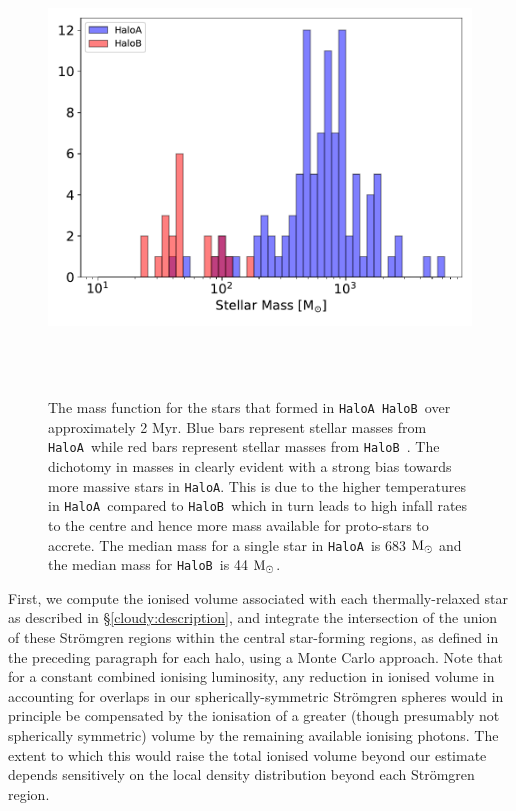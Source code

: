 \documentclass[graphics, twocolumn, usenatbib]{mn2e}
\newcommand{\msolar} {$\rm{M_{\odot}}~$}
\newcommand{\msolarc} {$\rm{M_{\odot}}$}
\newcommand{\ha} {\texttt{HaloA~}}
\newcommand{\hb} {\texttt{HaloB~}}
\newcommand{\hac} {\texttt{HaloA}}
\begin{document}
 
\begin{figure}
\centering
\begin{minipage}{175mm}      \begin{center}
\centerline{
    \includegraphics[width=18.0cm, height=12cm]{FIGURES/FinalMass_MultipleHaloes.pdf}}
\caption{
  The mass function for the stars that formed in \ha \hb over approximately 2 Myr.
  Blue bars represent stellar masses from \ha while red bars represent stellar masses from \hb.
  The dichotomy in masses in clearly evident with a strong bias towards more massive stars
  in \hac. This is due to the higher temperatures in \ha compared to \hb which in turn
  leads to high infall rates to the centre and hence more mass available for proto-stars
  to accrete. The median mass for a single star in \ha is 683 \msolar and the median mass
  for \hb is 44 \msolarc. 
}
\label{Fig:MassFunction}
\end{center} \end{minipage}
\end{figure}

First, we compute the ionised volume associated with each thermally-relaxed star as
described in \S\ref{cloudy:description}, and integrate the intersection of the union of these
Str{\"o}mgren regions within the central star-forming regions, as defined in the preceding paragraph
for each halo, using a Monte Carlo approach. Note that for a constant combined ionising luminosity,
any reduction in ionised volume in accounting for overlaps in our spherically-symmetric
Str{\"o}mgren spheres would in principle be compensated by the ionisation of a greater
(though presumably not spherically symmetric) volume by the remaining available
ionising photons. The extent to which this would raise the total ionised volume beyond
our estimate depends sensitively on the local density distribution beyond each Str{\" o}mgren region.
\end{document}
